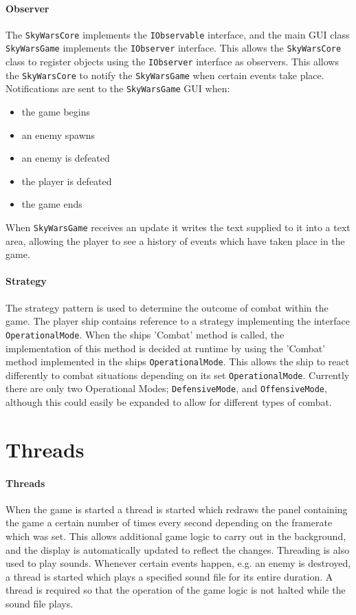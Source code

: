\documentclass{article}
\newcommand{\classname}[1]{\texttt{#1}}
\begin{document}
\begin{multicols}{2}
  		\paragraph{Observer}
  			The \classname{SkyWarsCore} implements the \classname{IObservable} interface, and the main GUI class \classname{SkyWarsGame} implements the \classname{IObserver} interface. This allows the \classname{SkyWarsCore} class to register objects using the \classname{IObserver} interface as observers. This allows the \classname{SkyWarsCore} to notify the \classname{SkyWarsGame} when certain events take place. Notifications are sent to the \classname{SkyWarsGame} GUI when:
  			\begin{itemize}[noitemsep]
  				\item the game begins
				\item an enemy spawns
				\item an enemy is defeated
				\item the player is defeated
				\item the game ends
			\end{itemize}
			When \classname{SkyWarsGame} receives an update it writes the text supplied to it into a text area, allowing the player to see a history of events which have taken place in the game.
  		\paragraph{Strategy}
  			The strategy pattern is used to determine the outcome of combat within the game. The player ship contains reference to a strategy implementing the interface \classname{OperationalMode}. When the ships 'Combat' method is called, the implementation of this method is decided at runtime by using the 'Combat' method implemented in the ships \classname{OperationalMode}. This allows the ship to react differently to combat situations depending on its set \classname{OperationalMode}. Currently there are only two Operational Modes; \classname{DefensiveMode}, and \classname{OffensiveMode}, although this could easily be expanded to allow for different types of combat.
  		\section{Threads}
  			\paragraph{Threads} When the game is started a thread is started which redraws the panel containing the game a certain number of times every second depending on the framerate which was set. This allows additional game logic to carry out in the background, and the display is automatically updated to reflect the changes. Threading is also used to play sounds. Whenever certain events happen, e.g. an enemy is destroyed, a thread is started which plays a specified sound file for its entire duration. A thread is required so that the operation of the game logic is not halted while the sound file plays.
  
  	\end{multicols}
  	
\end{document}
